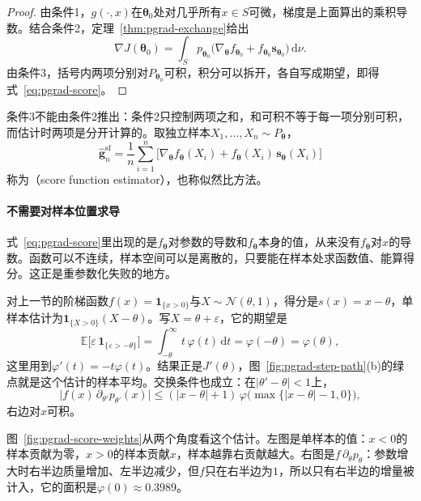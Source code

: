 \begin{proof}
由条件1，$g(\cdot,x)$在$\bm{\theta}_{0}$处对几乎所有$x\in S$可微，梯度是上面算出的乘积导数。结合条件2，定理~\ref{thm:pgrad-exchange}给出
\[
  \nabla J(\bm{\theta}_{0})=\int_{S}p_{\bm{\theta}_{0}}\bigl(\nabla_{\bm{\theta}}f_{\bm{\theta}_{0}}+f_{\bm{\theta}_{0}}\bm{s}_{\bm{\theta}_{0}}\bigr)\,\mathrm{d}\nu .
\]
由条件3，括号内两项分别对$P_{\bm{\theta}_{0}}$可积，积分可以拆开，各自写成期望，即得式~\eqref{eq:pgrad-score}。
\end{proof}

条件3不能由条件2推出：条件2只控制两项之和，和可积不等于每一项分别可积，而估计时两项是分开计算的。取独立样本$X_{1},\dots,X_{n}\sim P_{\bm{\theta}}$，
\begin{equation}
  \hat{\bm{g}}_{n}^{\mathrm{sf}}=\frac{1}{n}\sum_{i=1}^{n}\bigl[\nabla_{\bm{\theta}}f_{\bm{\theta}}(X_{i})+f_{\bm{\theta}}(X_{i})\,\bm{s}_{\bm{\theta}}(X_{i})\bigr]
  \label{eq:pgrad-score-estimator}
\end{equation}
称为（score function estimator），也称似然比方法。

\paragraph{不需要对样本位置求导}

式~\eqref{eq:pgrad-score}里出现的是$f_{\bm{\theta}}$对参数的导数和$f_{\bm{\theta}}$本身的值，从来没有$f_{\bm{\theta}}$对$x$的导数。函数可以不连续，样本空间可以是离散的，只要能在样本处求函数值、能算得分。这正是重参数化失败的地方。

对上一节的阶梯函数$f(x)=\mathbf{1}_{\{x>0\}}$与$X\sim\mathcal{N}(\theta,1)$，得分是$s(x)=x-\theta$，单样本估计为$\mathbf{1}_{\{X>0\}}(X-\theta)$。写$X=\theta+\varepsilon$，它的期望是
\[
  \mathbb{E}\bigl[\varepsilon\,\mathbf{1}_{\{\varepsilon>-\theta\}}\bigr]=\int_{-\theta}^{\infty}t\,\varphi(t)\,\mathrm{d}t=\varphi(-\theta)=\varphi(\theta),
\]
这里用到$\varphi'(t)=-t\varphi(t)$。结果正是$J'(\theta)$，图~\ref{fig:pgrad-step-path}(b)的绿点就是这个估计的样本平均。交换条件也成立：在$\lvert\theta'-\theta\rvert<1$上，
\[
  \bigl\lvert f(x)\,\partial_{\theta'}p_{\theta'}(x)\bigr\rvert\leq(\lvert x-\theta\rvert+1)\,\varphi\bigl(\max\{\lvert x-\theta\rvert-1,0\}\bigr),
\]
右边对$x$可积。

图~\ref{fig:pgrad-score-weights}从两个角度看这个估计。左图是单样本的值：$x<0$的样本贡献为零，$x>0$的样本贡献$x$，样本越靠右贡献越大。右图是$f\,\partial_{\theta}p_{\theta}$：参数增大时右半边质量增加、左半边减少，但$f$只在右半边为$1$，所以只有右半边的增量被计入，它的面积是$\varphi(0)\approx0.3989$。

